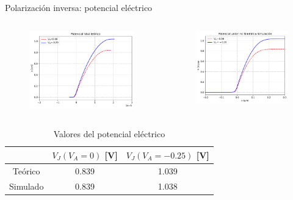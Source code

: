 \documentclass[aspectratio=169,xcolor=dvipsnames]{beamer}
\begin{document}
\begin{frame}{Polarización inversa: potencial eléctrico}
    
    \begin{columns}
        \begin{column}{0.5\textwidth}
            \begin{figure}
                \includegraphics[width=0.90\linewidth]{Teorico/Potencial_Electrico-Inversa.pdf}
            \end{figure}
        \end{column}
        \begin{column}{0.5\textwidth}
            \begin{figure}
                \includegraphics[width=0.90\linewidth]{Inversa/Potencial_Electrico-Inversa.pdf}
            \end{figure}
        \end{column}
        \end{columns}
        \begin{table}
            \caption{Valores del potencial eléctrico}
            \begin{tabular}{c|cc}
                & $V_J (V_A=0)$ [V] & $V_J (V_A=-0.25)$ [V] \\ \hline
                Teórico & 0.839 & 1.039 \\
                Simulado & 0.839 & 1.038 
            \end{tabular}
        \end{table}
\end{frame}
\end{document}
